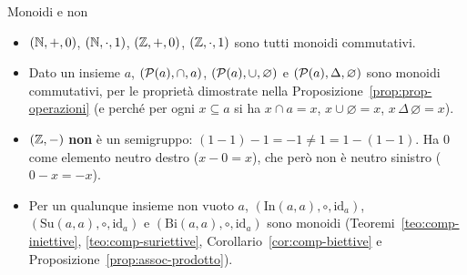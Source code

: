 
\begin{esempio}{Monoidi e non}
    \begin{itemize}
        \item $(\mathbb{N}, +, 0)$, $(\mathbb{N}, \cdot, 1)$, $(\mathbb{Z}, +, 0)$, $(\mathbb{Z}, \cdot, 1)$ sono tutti monoidi commutativi.
        \item Dato un insieme $a$, $(\mathcal{P}(a), \cap, a)$, $(\mathcal{P}(a), \cup, \varnothing)$ e $(\mathcal{P}(a), \Delta, \varnothing)$ sono monoidi
              commutativi, per le proprietà dimostrate nella Proposizione~\ref{prop:prop-operazioni} (e perché per ogni $x \subseteq a$
              si ha $x \cap a = x$, $x \cup \varnothing = x$, $x \,\Delta\, \varnothing = x$).
        \item $(\mathbb{Z}, -)$ \textbf{non} è un semigruppo: $(1 - 1) - 1 = -1 \neq 1 = 1 - (1 - 1)$. Ha $0$ come elemento neutro destro
              ($x - 0 = x$), che però non è neutro sinistro ($0 - x = -x$).
        \item Per un qualunque insieme non vuoto $a$, $(\mathrm{In}(a, a), \circ, \mathrm{id}_a)$, $(\mathrm{Su}(a, a), \circ, \mathrm{id}_a)$ e
              $(\mathrm{Bi}(a, a), \circ, \mathrm{id}_a)$ sono monoidi (Teoremi~\ref{teo:comp-iniettive}, \ref{teo:comp-suriettive},
              Corollario~\ref{cor:comp-biettive} e Proposizione~\ref{prop:assoc-prodotto}).
    \end{itemize}
\end{esempio}


